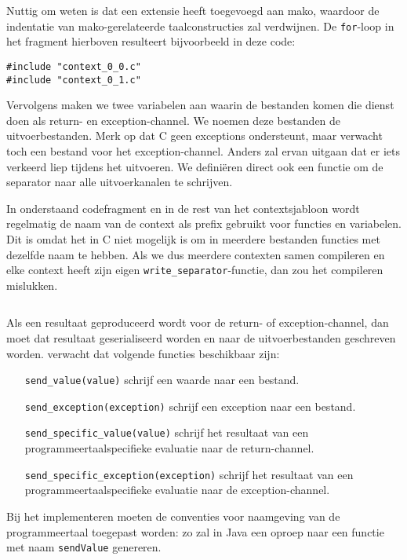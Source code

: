 Nuttig om weten is dat \tested{} een extensie heeft toegevoegd aan mako, waardoor de indentatie van mako-gerelateerde taalconstructies zal verdwijnen.
De \texttt{for}-loop in het fragment hierboven resulteert bijvoorbeeld in deze code:

\begin{verbatim}
#include "context_0_0.c"
#include "context_0_1.c"
\end{verbatim}

Vervolgens maken we twee variabelen aan waarin de bestanden komen die dienst doen als return- en exception-channel.
We noemen deze bestanden de uitvoerbestanden.
Merk op dat C geen exceptions ondersteunt, maar \tested{} verwacht toch een bestand voor het exception-channel.
Anders zal \tested{} ervan uitgaan dat er iets verkeerd liep tijdens het uitvoeren.
We definiëren direct ook een functie om de separator naar alle uitvoerkanalen te schrijven.

In onderstaand codefragment en in de rest van het contextsjabloon wordt regelmatig de naam van de context als prefix gebruikt voor functies en variabelen.
Dit is omdat het in C niet mogelijk is om in meerdere bestanden functies met dezelfde naam te hebben.
Als we dus meerdere contexten samen compileren en elke context heeft zijn eigen \texttt{write\_separator}-functie, dan zou het compileren mislukken.

\inputminted[firstline=13,lastline=21]{mako}{sources/c-context.mako}

Als een resultaat geproduceerd wordt voor de return- of exception-channel, dan moet dat resultaat geserialiseerd worden en naar de uitvoerbestanden geschreven worden.
\tested{} verwacht dat volgende functies beschikbaar zijn:

\begin{itemize}
    \item[\texttt{send\_value(value)}] schrijf een waarde naar een bestand.
    \item[\texttt{send\_exception(exception)}] schrijf een exception naar een bestand.
    \item[\texttt{send\_specific\_value(value)}] schrijf het resultaat van een programmeertaalspecifieke evaluatie naar de return-channel.
    \item[\texttt{send\_specific\_exception(exception)}] schrijf het resultaat van een programmeertaalspecifieke evaluatie naar de exception-channel.
\end{itemize}

Bij het implementeren moeten de conventies voor naamgeving van de programmeertaal toegepast worden: zo zal \tested{} in Java een oproep naar een functie met naam \texttt{sendValue} genereren.

